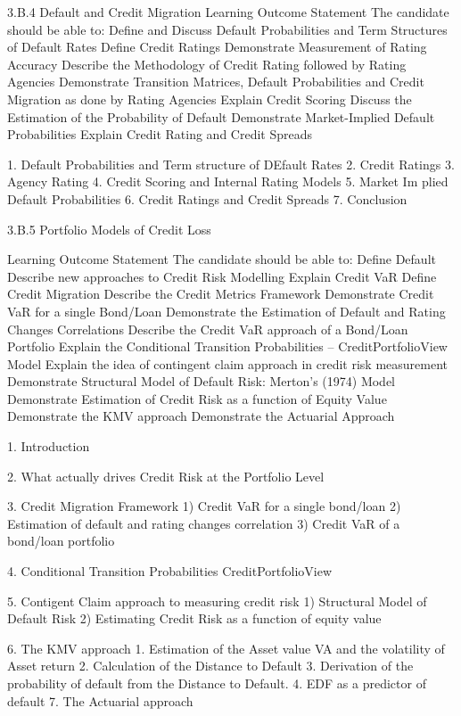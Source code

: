 3.B.4 Default and Credit Migration
Learning Outcome Statement
The candidate should be able to:
 Define and Discuss Default Probabilities and Term Structures of
Default Rates
 Define Credit Ratings
 Demonstrate Measurement of Rating Accuracy
 Describe the Methodology of Credit Rating followed by Rating Agencies
 Demonstrate Transition Matrices, Default Probabilities and Credit Migration
as done by Rating Agencies
 Explain Credit Scoring
 Discuss the Estimation of the Probability of Default
 Demonstrate Market-Implied Default Probabilities
 Explain Credit Rating and Credit Spreads

1. Default Probabilities and Term structure of DEfault Rates
2. Credit Ratings
3. Agency Rating
4. Credit Scoring and Internal Rating Models
5. Market Im plied Default Probabilities
6. Credit Ratings and Credit Spreads
7. Conclusion

3.B.5 Portfolio Models of Credit Loss

Learning Outcome Statement
The candidate should be able to:
 Define Default
 Describe new approaches to Credit Risk Modelling
 Explain Credit VaR
 Define Credit Migration
 Describe the Credit Metrics Framework
 Demonstrate Credit VaR for a single Bond/Loan
 Demonstrate the Estimation of Default and Rating Changes Correlations
 Describe the Credit VaR approach of a Bond/Loan Portfolio
 Explain the Conditional Transition Probabilities – CreditPortfolioView Model
 Explain the idea of contingent claim approach in credit risk measurement
 Demonstrate Structural Model of Default Risk: Merton’s (1974) Model
 Demonstrate Estimation of Credit Risk as a function of Equity Value
 Demonstrate the KMV approach
 Demonstrate the Actuarial Approach

1. Introduction

2. What actually drives Credit Risk at the Portfolio Level

3. Credit Migration Framework
 1) Credit VaR for a single bond/loan
 2) Estimation of default and rating changes correlation
 3) Credit VaR of a bond/loan portfolio

4. Conditional Transition Probabilities CreditPortfolioView

5. Contigent Claim approach to measuring credit risk
 1) Structural Model of Default Risk
 2) Estimating Credit Risk as a function of equity value

6. The KMV approach
	1. Estimation of the Asset value VA and the volatility of Asset return
	2. Calculation of the Distance to Default
	3. Derivation of the probability of default from the Distance to Default.
	4. EDF as a predictor of default
7. The Actuarial approach

